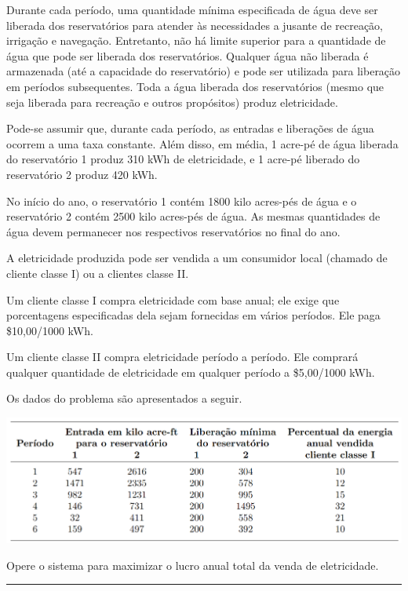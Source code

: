 \documentclass[
]{book}
\begin{document}
Durante cada período, uma quantidade mínima especificada de água deve ser liberada dos reservatórios para atender às necessidades a jusante de recreação, irrigação e navegação. Entretanto, não há limite superior para a quantidade de água que pode ser liberada dos reservatórios. Qualquer água não liberada é armazenada (até a capacidade do reservatório) e pode ser utilizada para liberação em períodos subsequentes. Toda a água liberada dos reservatórios (mesmo que seja liberada para recreação e outros propósitos) produz eletricidade.

Pode-se assumir que, durante cada período, as entradas e liberações de água ocorrem a uma taxa constante. Além disso, em média, 1 acre-pé de água liberada do reservatório 1 produz 310 kWh de eletricidade, e 1 acre-pé liberado do reservatório 2 produz 420 kWh.

No início do ano, o reservatório 1 contém 1800 kilo acres-pés de água e o reservatório 2 contém 2500 kilo acres-pés de água. As mesmas quantidades de água devem permanecer nos respectivos reservatórios no final do ano.

A eletricidade produzida pode ser vendida a um consumidor local (chamado de cliente classe I) ou a clientes classe II.

Um cliente classe I compra eletricidade com base anual; ele exige que porcentagens especificadas dela sejam fornecidas em vários períodos. Ele paga \$10,00/1000 kWh.

Um cliente classe II compra eletricidade período a período. Ele comprará qualquer quantidade de eletricidade em qualquer período a \$5,00/1000 kWh.

Os dados do problema são apresentados a seguir.

\includegraphics{Imagens/TabelaEx_1.png}

Opere o sistema para maximizar o lucro anual total da venda de eletricidade.

\begin{center}\rule{0.5\linewidth}{0.5pt}\end{center}
\end{document}
